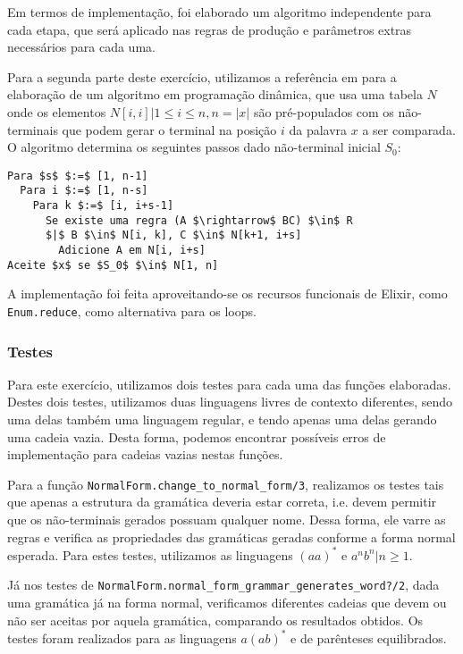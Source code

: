 \documentclass[journal,transmag]{IEEEtran}
\begin{document}
Em termos de implementação, foi elaborado um algoritmo independente para cada
etapa, que será aplicado nas regras de produção e parâmetros extras necessários
para cada uma.

Para a segunda parte deste exercício, utilizamos a referência em \cite{livro}
para a elaboração de um algoritmo em programação dinâmica, que usa uma tabela
$N$ onde os elementos $N[i, i] | 1 \leq i \leq n, n = \left|x\right|$ são
pré-populados com os não-terminais que podem gerar o terminal na posição $i$ da
palavra $x$ a ser comparada. O algoritmo determina os seguintes passos dado
não-terminal inicial $S_0$:

\begingroup
\fontsize{8pt}{12pt}\selectfont
\begin{lstlisting}[mathescape=true]
Para $s$ $:=$ [1, n-1]
  Para i $:=$ [1, n-s]
    Para k $:=$ [i, i+s-1]
      Se existe uma regra (A $\rightarrow$ BC) $\in$ R
      $|$ B $\in$ N[i, k], C $\in$ N[k+1, i+s]
        Adicione A em N[i, i+s]
Aceite $x$ se $S_0$ $\in$ N[1, n]
\end{lstlisting}
\endgroup

A implementação foi feita aproveitando-se os recursos funcionais de Elixir, como
\texttt{Enum.reduce}, como alternativa para os loops.

\subsubsection{Testes}
Para este exercício, utilizamos dois testes para cada uma das funções
elaboradas. Destes dois testes, utilizamos duas linguagens livres de contexto
diferentes, sendo uma delas também uma linguagem regular, e tendo apenas uma
delas gerando uma cadeia vazia. Desta forma, podemos encontrar possíveis erros
de implementação para cadeias vazias nestas funções.

Para a função
\texttt{NormalForm.change\allowbreak\_to\allowbreak\_normal\allowbreak\_form/3},
realizamos os testes tais que apenas a estrutura da gramática deveria estar
correta, i.e. devem permitir que os não-terminais gerados possuam qualquer nome.
Dessa forma, ele varre as regras e verifica as propriedades das gramáticas
geradas conforme a forma normal esperada. Para estes testes, utilizamos as
linguagens $(aa)^*$ e $a^n b^n | n \geq 1$.

Já nos testes de
\texttt{NormalForm.normal\allowbreak\_form\allowbreak\_grammar\allowbreak\_generates\allowbreak\_word?/2},
dada uma gramática já na forma normal, verificamos diferentes cadeias que devem
ou não ser aceitas por aquela gramática, comparando os resultados obtidos. Os
testes foram realizados para as linguagens $a(ab)^*$ e de parênteses
equilibrados.
\end{document}

